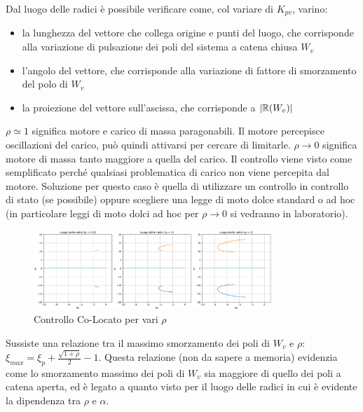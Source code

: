 Dal luogo delle radici è possibile verificare come, col variare di \(K_{pv}\), varino: 
\begin{itemize}
    \item la lunghezza del vettore che collega origine e punti del luogo, che corrisponde alla variazione di pulsazione dei poli del sistema a catena chiusa \(W_v\)
    \item l'angolo del vettore, che corrisponde alla variazione di fattore di smorzamento del polo di \(W_v\)
    \item la proiezione del vettore sull'ascissa, che corrisponde a \(\left|\mathbb{R}(W_v)\right|\)
\end{itemize}

\(\rho \simeq 1\) significa motore e carico di massa paragonabili. Il motore percepisce oscillazioni del carico, può quindi attivarsi per cercare di limitarle.
\(\rho \rightarrow 0\) significa motore di massa tanto maggiore a quella del carico. Il controllo viene visto come semplificato perché qualsiasi problematica di carico non viene percepita dal motore. Soluzione per questo caso è quella di utilizzare un controllo in controllo di stato (se possibile) oppure scegliere una legge di moto dolce standard o ad hoc (in particolare leggi di moto dolci ad hoc per \(\rho \rightarrow 0\) si vedranno in laboratorio).

\begin{figure}[h]
    \centering
    \includegraphics[width=0.8\textwidth]{Immagini/controllo_v_colocato_subplot_rho.png}
    \caption{Controllo Co-Locato per vari \(\rho\)}
\end{figure}

Sussiste una relazione tra il massimo smorzamento dei poli di \(W_v\) e \(\rho\): \(\xi_{max} = \xi_p + \frac{\sqrt{1+\rho}}{2} - 1\). Questa relazione (non da sapere a memoria) evidenzia come lo smorzamento massimo dei poli di \(W_v\) sia maggiore di quello dei poli a catena aperta, ed è legato a quanto visto per il luogo delle radici in cui è evidente la dipendenza tra \(\rho\) e \(\alpha\).

